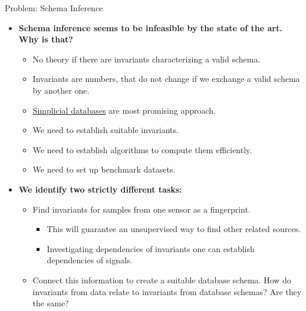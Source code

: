 \documentclass[aspectratio=169,t]{beamer}
\begin{document}
  { 
    \begin{frame}{Problem: Schema Inference}
    \begin{itemize}
      \item \textbf{Schema inference seems to be infeasible by the state of the art. Why is that?}
      \begin{itemize}
        \item No theory if there are invariants characterizing a valid schema.
        \item Invariants are numbers, that do not change if we exchange a valid schema by another one.
        \item \href{http://math.mit.edu/~dspivak/informatics/SD.pdf}{Simplicial databases} are most promising approach.
        \item We need to establish suitable invariants.
        \item We need to establish algorithms to compute them efficiently.
        \item We need to set up benchmark datasets.
      \end{itemize}
      \item \textbf{We identify two strictly different tasks:}
      \begin{itemize}
        \item Find invariants for samples from one sensor as a fingerprint.
        \begin{itemize}
            \item This will guarantee an unsupervised way to find other related sources.
            \item Investigating dependencies of invariants one can establish dependencies of signals.
        \end{itemize}
        \item Connect this information to create a suitable database schema. How do invariants from data relate to invariants from database schemas? Are they the same?
      \end{itemize}
    \end{itemize}
    \end{frame}
  }
\end{document}
